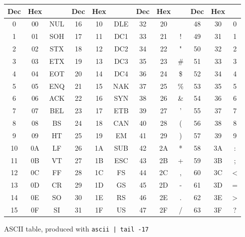 \documentclass[../index.tex]{subfiles}
\begin{document}
\begin{frame}{\currenttitle}
%
%
%
%
  \vspace*{1em}
  \scriptsize
  \begin{figure}
    \begin{table}
      \begin{tabular}{|c|c|c||c|c|c||c|c|c||c|c|c|}                       \hline
        Dec & Hex &    & Dec & Hex &    & Dec & Hex &   & Dec & Hex &  \\ \hline
        0  & 00 & NUL  & 16 & 10 & DLE  & 32 & 20 &     & 48 & 30 & 0  \\
        1  & 01 & SOH  & 17 & 11 & DC1  & 33 & 21 & !   & 49 & 31 & 1  \\
        2  & 02 & STX  & 18 & 12 & DC2  & 34 & 22 & "   & 50 & 32 & 2  \\
        3  & 03 & ETX  & 19 & 13 & DC3  & 35 & 23 & #   & 51 & 33 & 3  \\
        4  & 04 & EOT  & 20 & 14 & DC4  & 36 & 24 & \$  & 52 & 34 & 4  \\
        5  & 05 & ENQ  & 21 & 15 & NAK  & 37 & 25 & \%  & 53 & 35 & 5  \\
        6  & 06 & ACK  & 22 & 16 & SYN  & 38 & 26 & \&  & 54 & 36 & 6  \\
        7  & 07 & BEL  & 23 & 17 & ETB  & 39 & 27 & '   & 55 & 37 & 7  \\
        8  & 08 & BS   & 24 & 18 & CAN  & 40 & 28 & (   & 56 & 38 & 8  \\
        9  & 09 & HT   & 25 & 19 & EM   & 41 & 29 & )   & 57 & 39 & 9  \\
        10 & 0A & LF   & 26 & 1A & SUB  & 42 & 2A & *   & 58 & 3A & :  \\
        11 & 0B & VT   & 27 & 1B & ESC  & 43 & 2B & +   & 59 & 3B & ;  \\
        12 & 0C & FF   & 28 & 1C & FS   & 44 & 2C & ,   & 60 & 3C & <  \\
        13 & 0D & CR   & 29 & 1D & GS   & 45 & 2D & -   & 61 & 3D & =  \\
        14 & 0E & SO   & 30 & 1E & RS   & 46 & 2E & .   & 62 & 3E & >  \\
        15 & 0F & SI   & 31 & 1F & US   & 47 & 2F & /   & 63 & 3F & ?  \\ \hline
      \end{tabular}
    \end{table}
    \caption{ASCII table, produced with \texttt{ascii | tail -17}}
  \end{figure}
  \normal
\end{frame}
\end{document}
